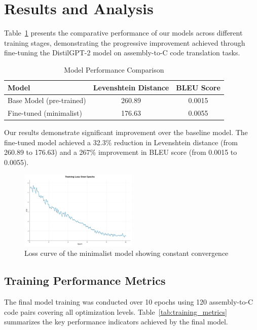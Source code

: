 \documentclass[../main.tex]{subfiles}
\begin{document}
\section{Results and Analysis}

Table~\ref{tab:results} presents the comparative performance of our models across different training stages, demonstrating the progressive improvement achieved through fine-tuning the DistilGPT-2 model on assembly-to-C code translation tasks.

\begin{table}[htbp]
\centering
\caption{Model Performance Comparison}
\label{tab:results}
\begin{tabular}{lcc}
\toprule
\textbf{Model} & \textbf{Levenshtein Distance} & \textbf{BLEU Score} \\
\midrule
Base Model (pre-trained) & 260.89 & 0.0015 \\
Fine-tuned (minimalist) & 176.63 & 0.0055 \\
\bottomrule
\end{tabular}
\end{table}

Our results demonstrate significant improvement over the baseline model. The fine-tuned model achieved a 32.3\% reduction in Levenshtein distance (from 260.89 to 176.63) and a 267\% improvement in BLEU score (from 0.0015 to 0.0055).

\begin{figure}[htbp]
\centering
\includegraphics[width=0.5\textwidth]{images/minimalist_loss.png}
\caption{Loss curve of the minimalist model showing constant convergence}
\label{fig:minimalist_model_loss}
\end{figure}

\subsection{Training Performance Metrics}

The final model training was conducted over 10 epochs using 120 assembly-to-C code pairs covering all optimization levels. Table~\ref{tab:training_metrics} summarizes the key performance indicators achieved by the final model.
\end{document}
